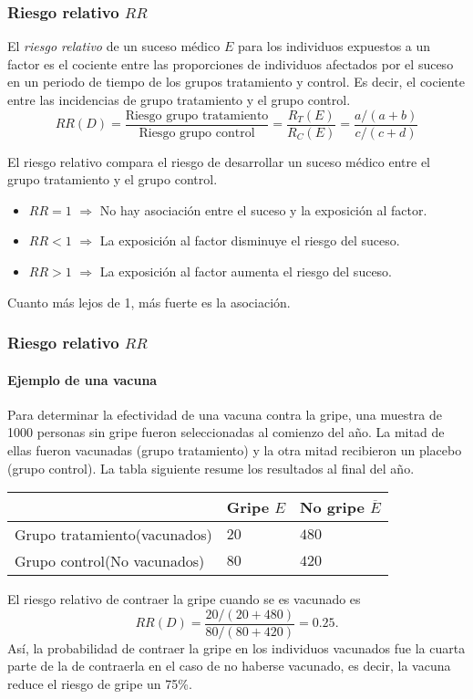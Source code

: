 	
\begin{frame}
\frametitle{Riesgo relativo $RR$}
\begin{definicion}
El \emph{riesgo relativo} de un suceso médico $E$ para los individuos expuestos a un factor es el cociente entre las proporciones de individuos afectados por el suceso en un periodo de tiempo de los grupos tratamiento y control.
Es decir, el cociente entre las incidencias de grupo tratamiento y el grupo control.
\[
  RR(D)=\frac{\mbox{Riesgo grupo tratamiento}}{\mbox{Riesgo grupo control}}=\frac{R_T(E)}{R_C(E)}=\frac{a/(a+b)}{c/(c+d)}
\]
\end{definicion}

El riesgo relativo compara el riesgo de desarrollar un suceso médico entre el grupo tratamiento y el grupo control.
\begin{itemize}
  \item $RR=1$ $\Rightarrow$ No hay asociación entre el suceso y la exposición al factor.
  \item $RR<1$ $\Rightarrow$ La exposición al factor disminuye el riesgo del suceso.
  \item $RR>1$ $\Rightarrow$ La exposición al factor aumenta el riesgo del suceso.
\end{itemize}
Cuanto más lejos de 1, más fuerte es la asociación. 
\end{frame}


\begin{frame}
\frametitle{Riesgo relativo $RR$}
\framesubtitle{Ejemplo de una vacuna}
Para determinar la efectividad de una vacuna contra la gripe, una muestra de 1000 personas sin gripe fueron seleccionadas al comienzo del año. 
La mitad de ellas fueron vacunadas (grupo tratamiento) y la otra mitad recibieron un placebo (grupo control).
La tabla siguiente resume los resultados al final del año.

\begin{center}
  \begin{tabular}{|m{3cm}|m{1.8cm}<{\centering}|m{1.8cm}<{\centering}|}
  \cline{2-3}
  \multicolumn{1}{c|}{} & Gripe $E$ & No gripe $\overline E$\\ 
  \hline
  Grupo tratamiento\newline (vacunados) & $20$ & $480$\\ 
  \hline 
  Grupo control\newline (No vacunados) & $80$ & $420$\\ 
  \hline
\end{tabular}
\end{center}

El riesgo relativo de contraer la gripe cuando se es vacunado es 
\[
  RR(D) = \frac{20/(20+480)}{80/(80+420)} = 0.25.
\]
Así, la probabilidad de contraer la gripe en los individuos vacunados fue la cuarta parte de la de contraerla en el caso de no haberse vacunado, es decir, la vacuna reduce el riesgo de gripe un 75\%.
\end{frame}


